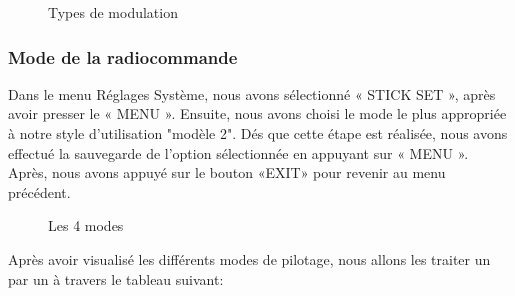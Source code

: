 	\begin{figure}[H]
		\begin{center}
			\centering
		\end{center}
		\caption{Types de modulation}
	\end{figure}
	\subsubsection{Mode de la radiocommande }
	Dans le menu Réglages Système, nous avons sélectionné « STICK SET », après avoir presser le « MENU ». Ensuite, nous avons choisi le mode le plus appropriée à notre style d'utilisation "modèle 2". Dés que cette étape est réalisée, nous avons effectué la sauvegarde de l'option sélectionnée en appuyant sur « MENU ». Après, nous avons appuyé sur le bouton «EXIT» pour revenir au menu précédent.
	\begin{figure}[H]
		\begin{center}
			\centering
		\end{center}
		\caption{Les 4 modes}
	\end{figure}
	
	Après avoir visualisé les différents modes de pilotage, nous allons les traiter un par un à travers le tableau suivant:
	
